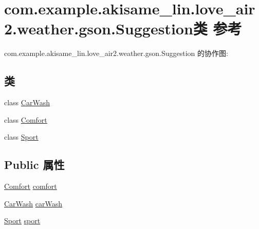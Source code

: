 \hypertarget{classcom_1_1example_1_1akisame__lin_1_1love__air2_1_1weather_1_1gson_1_1_suggestion}{}\section{com.\+example.\+akisame\+\_\+lin.\+love\+\_\+air2.\+weather.\+gson.\+Suggestion类 参考}
\label{classcom_1_1example_1_1akisame__lin_1_1love__air2_1_1weather_1_1gson_1_1_suggestion}


com.\+example.\+akisame\+\_\+lin.\+love\+\_\+air2.\+weather.\+gson.\+Suggestion 的协作图\+:
\subsection*{类}
\begin{DoxyCompactItemize}
\item 
class \mbox{\hyperlink{classcom_1_1example_1_1akisame__lin_1_1love__air2_1_1weather_1_1gson_1_1_suggestion_1_1_car_wash}{Car\+Wash}}
\item 
class \mbox{\hyperlink{classcom_1_1example_1_1akisame__lin_1_1love__air2_1_1weather_1_1gson_1_1_suggestion_1_1_comfort}{Comfort}}
\item 
class \mbox{\hyperlink{classcom_1_1example_1_1akisame__lin_1_1love__air2_1_1weather_1_1gson_1_1_suggestion_1_1_sport}{Sport}}
\end{DoxyCompactItemize}
\subsection*{Public 属性}
\begin{DoxyCompactItemize}
\item 
\mbox{\hyperlink{classcom_1_1example_1_1akisame__lin_1_1love__air2_1_1weather_1_1gson_1_1_suggestion_1_1_comfort}{Comfort}} \mbox{\hyperlink{classcom_1_1example_1_1akisame__lin_1_1love__air2_1_1weather_1_1gson_1_1_suggestion_aa26b464f6d45220e461c3832fee520f0}{comfort}}
\item 
\mbox{\hyperlink{classcom_1_1example_1_1akisame__lin_1_1love__air2_1_1weather_1_1gson_1_1_suggestion_1_1_car_wash}{Car\+Wash}} \mbox{\hyperlink{classcom_1_1example_1_1akisame__lin_1_1love__air2_1_1weather_1_1gson_1_1_suggestion_acb13854ce401fcc451c5bee4dfa4ed3d}{car\+Wash}}
\item 
\mbox{\hyperlink{classcom_1_1example_1_1akisame__lin_1_1love__air2_1_1weather_1_1gson_1_1_suggestion_1_1_sport}{Sport}} \mbox{\hyperlink{classcom_1_1example_1_1akisame__lin_1_1love__air2_1_1weather_1_1gson_1_1_suggestion_a5741c9946f602bf0a0bcd338a8450dc6}{sport}}
\end{DoxyCompactItemize}


